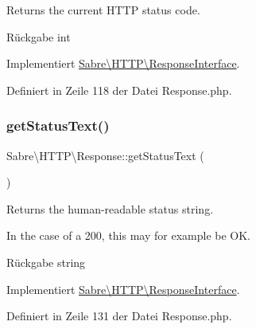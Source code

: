 Returns the current H\+T\+TP status code.

\begin{DoxyReturn}{Rückgabe}
int 
\end{DoxyReturn}


Implementiert \mbox{\hyperlink{interface_sabre_1_1_h_t_t_p_1_1_response_interface_a4424cb29068d23ac01d92fdaf97351c8}{Sabre\textbackslash{}\+H\+T\+T\+P\textbackslash{}\+Response\+Interface}}.



Definiert in Zeile 118 der Datei Response.\+php.

\mbox{\label{class_sabre_1_1_h_t_t_p_1_1_response_af303e7bec58ea83086d1b7fe6cd7060d}} 
\subsubsection{\texorpdfstring{get\+Status\+Text()}{getStatusText()}}
{\footnotesize\ttfamily Sabre\textbackslash{}\+H\+T\+T\+P\textbackslash{}\+Response\+::get\+Status\+Text (\begin{DoxyParamCaption}{ }\end{DoxyParamCaption})}

Returns the human-\/readable status string.

In the case of a 200, this may for example be \textquotesingle{}OK\textquotesingle{}.

\begin{DoxyReturn}{Rückgabe}
string 
\end{DoxyReturn}


Implementiert \mbox{\hyperlink{interface_sabre_1_1_h_t_t_p_1_1_response_interface_a5fe5d34d36b2fa98e074a463f8368427}{Sabre\textbackslash{}\+H\+T\+T\+P\textbackslash{}\+Response\+Interface}}.



Definiert in Zeile 131 der Datei Response.\+php.

\mbox{\label{class_sabre_1_1_h_t_t_p_1_1_response_aa2f393e4e475f4b6019b7add7a99be86}} 
